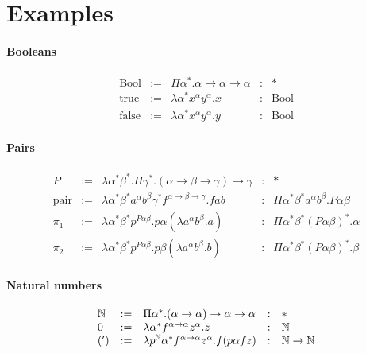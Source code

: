 \section{Examples}


\paragraph{Booleans}
$$
\begin{array}{lllll}
  \text{Bool}
  &:=& \Pi \alpha^* . \alpha\to\alpha\to\alpha
  &:& *
  \\
  \text{true}
  &:=& \lambda \alpha^* x^\alpha y^\alpha . x
  &:& \text{Bool}
  \\
  \text{false}
  &:=& \lambda \alpha^* x^\alpha y^\alpha . y
  &:& \text{Bool}
\end{array}
$$


\paragraph{Pairs}

$$
\begin{array}{lllll}
  P
  &:=& \lambda \alpha^* \beta^*
       . \Pi \gamma^*
       . (\alpha\to\beta\to\gamma) \to \gamma
  &:& *
  \\
  \text{pair}
  &:=& \lambda
       \alpha^*
       \beta^*
       a^\alpha
       b^\beta
       \gamma^*
       f^{\alpha\to\beta\to\gamma}
       . f a b
  &:& \Pi \alpha^* \beta^* a^\alpha b^\beta . P \alpha \beta
  \\
  \pi_1
  &:=& \lambda
       \alpha^*
       \beta^*
       p^{P\alpha\beta}
       . p \alpha (\lambda a^\alpha b^\beta. a)
  &:& \Pi \alpha^* \beta^* (P\alpha\beta)^* . \alpha
  \\
  \pi_2
  &:=& \lambda
       \alpha^*
       \beta^*
       p^{P\alpha\beta}
       . p \beta (\lambda a^\alpha b^\beta. b)
  &:& \Pi \alpha^* \beta^* (P\alpha\beta)^* . \beta
\end{array}
$$



\paragraph{Natural numbers}
$$
\begin{array}{lllll}
  \mathbb{N}
  &:= & \Pi \alpha^* . (\alpha \to \alpha) \to \alpha \to \alpha
  &:& *
  \\
  0
  &:=& \lambda \alpha^* f^{\alpha\to\alpha} z^\alpha. z
  &:& \mathbb{N}
  \\
  (')
  &:=& \lambda p^{\mathbb{N}} \alpha^* f^{\alpha\to\alpha} z^\alpha . f (p \alpha f z)
  &:& \mathbb{N}\to\mathbb{N}
\end{array}
$$

